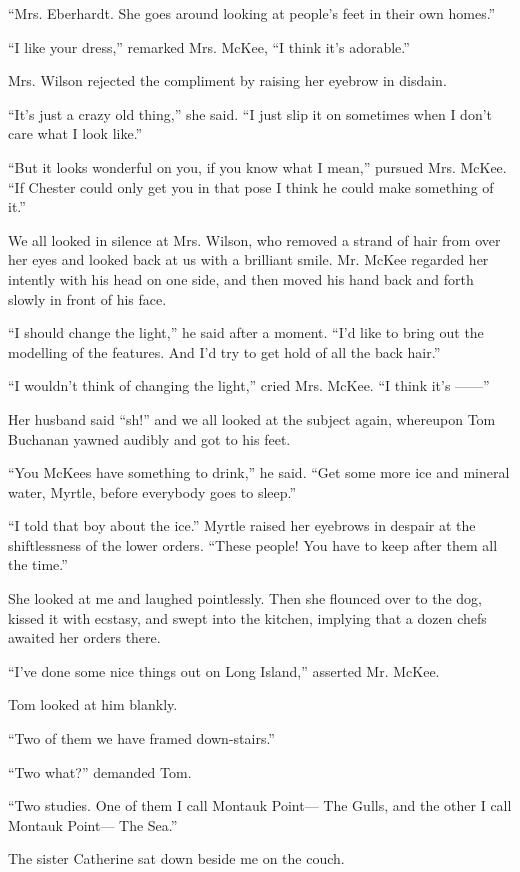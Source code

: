 \documentclass{znotebook}
\begin{document}
``Mrs. Eberhardt. She goes around looking at people’s feet in their own homes.''

``I like your dress,'' remarked Mrs. McKee, ``I think it’s adorable.''

Mrs. Wilson rejected the compliment by raising her eyebrow in disdain.

``It’s just a crazy old thing,'' she said. ``I just slip it on sometimes when I don’t care what I look like.''

``But it looks wonderful on you, if you know what I mean,'' pursued Mrs. McKee. ``If Chester could only get you in that pose I think he could make something of it.''

We all looked in silence at Mrs. Wilson, who removed a strand of hair from over her eyes and looked back at us with a brilliant smile. Mr. McKee regarded her intently with his head on one side, and then moved his hand back and forth slowly in front of his face.

``I should change the light,'' he said after a moment. ``I’d like to bring out the modelling of the features. And I’d try to get hold of all the back hair.''

``I wouldn’t think of changing the light,'' cried Mrs. McKee. ``I think it’s ——''

Her husband said ``sh!'' and we all looked at the subject again, whereupon Tom Buchanan yawned audibly and got to his feet.

``You McKees have something to drink,'' he said. ``Get some more ice and mineral water, Myrtle, before everybody goes to sleep.''

``I told that boy about the ice.'' Myrtle raised her eyebrows in despair at the shiftlessness of the lower orders. ``These people! You have to keep after them all the time.''

She looked at me and laughed pointlessly. Then she flounced over to the dog, kissed it with ecstasy, and swept into the kitchen, implying that a dozen chefs awaited her orders there.

``I’ve done some nice things out on Long Island,'' asserted Mr. McKee.

Tom looked at him blankly.

``Two of them we have framed down-stairs.''

``Two what?'' demanded Tom.

``Two studies. One of them I call Montauk Point— The Gulls, and the other I call Montauk Point— The Sea.''

The sister Catherine sat down beside me on the couch.
\end{document}
